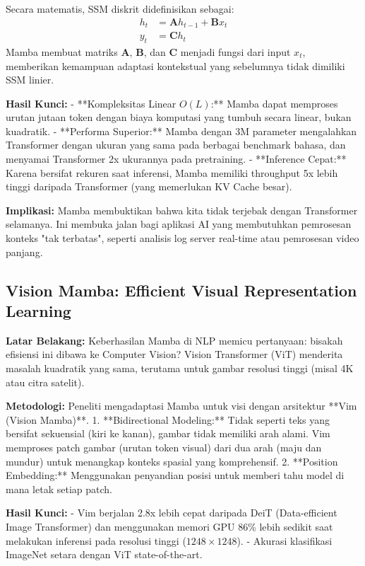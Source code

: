 Secara matematis, SSM diskrit didefinisikan sebagai:
\begin{align}
h_t &= \mathbf{A} h_{t-1} + \mathbf{B} x_t \\
y_t &= \mathbf{C} h_t
\end{align}
Mamba membuat matriks $\mathbf{A}$, $\mathbf{B}$, dan $\mathbf{C}$ menjadi fungsi dari input $x_t$, memberikan kemampuan adaptasi kontekstual yang sebelumnya tidak dimiliki SSM linier.

\textbf{Hasil Kunci:}
- **Kompleksitas Linear $O(L)$:** Mamba dapat memproses urutan jutaan token dengan biaya komputasi yang tumbuh secara linear, bukan kuadratik.
- **Performa Superior:** Mamba dengan 3M parameter mengalahkan Transformer dengan ukuran yang sama pada berbagai benchmark bahasa, dan menyamai Transformer 2x ukurannya pada pretraining.
- **Inference Cepat:** Karena bersifat rekuren saat inferensi, Mamba memiliki throughput 5x lebih tinggi daripada Transformer (yang memerlukan KV Cache besar).

\textbf{Implikasi:}
Mamba membuktikan bahwa kita tidak terjebak dengan Transformer selamanya. Ini membuka jalan bagi aplikasi AI yang membutuhkan pemrosesan konteks "tak terbatas", seperti analisis log server real-time atau pemrosesan video panjang.

\subsection{Vision Mamba: Efficient Visual Representation Learning \cite{zhu2024vision}}

\textbf{Latar Belakang:}
Keberhasilan Mamba di NLP memicu pertanyaan: bisakah efisiensi ini dibawa ke Computer Vision? Vision Transformer (ViT) menderita masalah kuadratik yang sama, terutama untuk gambar resolusi tinggi (misal 4K atau citra satelit).

\textbf{Metodologi:}
Peneliti mengadaptasi Mamba untuk visi dengan arsitektur **Vim (Vision Mamba)**.
1.  **Bidirectional Modeling:** Tidak seperti teks yang bersifat sekuensial (kiri ke kanan), gambar tidak memiliki arah alami. Vim memproses patch gambar (urutan token visual) dari dua arah (maju dan mundur) untuk menangkap konteks spasial yang komprehensif.
2.  **Position Embedding:** Menggunakan penyandian posisi untuk memberi tahu model di mana letak setiap patch.

\textbf{Hasil Kunci:}
- Vim berjalan 2.8x lebih cepat daripada DeiT (Data-efficient Image Transformer) dan menggunakan memori GPU 86\% lebih sedikit saat melakukan inferensi pada resolusi tinggi ($1248 \times 1248$).
- Akurasi klasifikasi ImageNet setara dengan ViT state-of-the-art.

